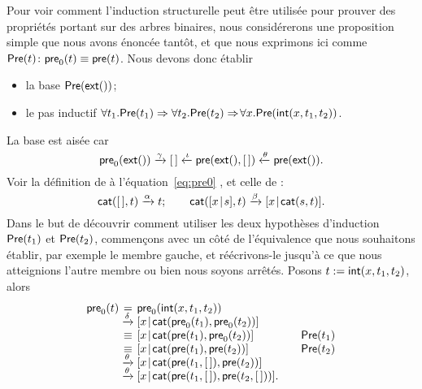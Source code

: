 Pour voir comment l'induction structurelle peut être utilisée pour
prouver des propriétés portant sur des arbres binaires, nous
considérerons une proposition simple que nous avons énoncée tantôt, et
que nous exprimons ici comme \(\textsf{Pre}({t}) \colon \textsf{pre}_0(t)
\equiv
\textsf{pre}(t)\).
Nous devons donc établir
\begin{itemize}

  \item la base \(\textsf{Pre}({\textsf{ext}()})\);

  \item le pas inductif \(\forall t_1.\textsf{Pre}({t_1}) \Rightarrow
    \forall t_2.\textsf{Pre}({t_2}) \Rightarrow \! \forall
    x.\textsf{Pre}({\textsf{int}(x,t_1,t_2)})\).

\end{itemize}
La base est aisée car
\begin{equation*}
  \textsf{pre}_0(\textsf{ext}())
  \xrightarrow{\smash{\gamma}} [\,] \xleftarrow{\smash{\iota}}
  \textsf{pre}(\textsf{ext}(),[\,]) \xleftarrow{\smash{\theta}}
  \textsf{pre}(\textsf{ext}()).
\end{equation*}
Voir la définition de  à
l'équation~\eqref{eq:pre0} , et celle de
:
\begin{equation*}
\textsf{cat}([\,],t) \xrightarrow{\smash{\alpha}} t;
\qquad
\textsf{cat}([{x}\!\mid\!{s}],t) \xrightarrow{\smash{\beta}}
[{x}\!\mid\!{\textsf{cat}(s,t)}].
\end{equation*}
Dans le but de découvrir comment utiliser les deux hypothèses
d'induction \(\textsf{Pre}({t_1})\) et
\(\textsf{Pre}({t_2})\), commençons avec un côté
de l'équivalence que nous souhaitons établir, par exemple le membre
gauche, et réécrivons-le jusqu'à ce que nous atteignions l'autre
membre ou bien nous soyons arrêtés. Posons \(t :=
\textsf{int}(x,t_1,t_2)\), alors
\begin{equation*}
\begin{array}{@{}r@{\;}c@{\;}l@{\qquad}r@{}}
\fun{pre}_0(t)
& = & \fun{pre}_0(\fun{int}(x,t_1,t_2))\\
& \xrightarrow{\smash{\delta}}
& \cons{x}{\fun{cat}(\fun{pre}_0(t_1), \fun{pre}_0(t_2))}\\
& \equiv & \cons{x}{\fun{cat}(\fun{pre}(t_1), \fun{pre}_0(t_2))}
& \IH{\pred{Pre}{t_1}}\\
& \equiv & \cons{x}{\fun{cat}(\fun{pre}(t_1), \fun{pre}(t_2))}
& \IH{\pred{Pre}{t_2}}\\
& \xrightarrow{\smash{\theta}}
& \cons{x}{\fun{cat}(\fun{pre}(t_1,\el), \fun{pre}(t_2))}\\
& \xrightarrow{\smash{\theta}}
& \cons{x}{\fun{cat}(\fun{pre}(t_1,\el), \fun{pre}(t_2,\el))}.
\end{array}
\end{equation*}
